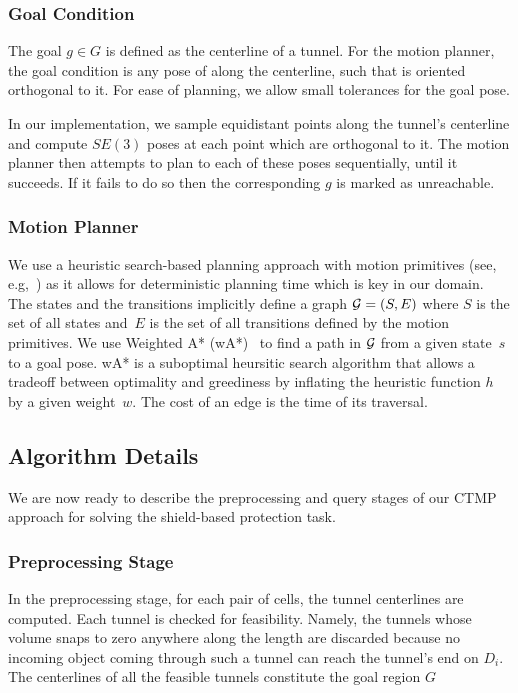 \documentclass[a4paper]{report}
\begin{document}
\subsubsection{Goal Condition}
The goal $g \in G$ is defined as the centerline of a tunnel. For the motion planner, the goal condition is any pose of \calS along the centerline, such that \calS is oriented orthogonal to it. For ease of planning, we allow small tolerances for the goal pose.

In our implementation, we sample equidistant points along the tunnel's centerline and compute $SE(3)$ poses at each point which are orthogonal to it. The motion planner then attempts to plan to each of these poses sequentially, until it succeeds. If it fails to do so then the corresponding $g$ is marked as unreachable.
 
\subsubsection{Motion Planner}
We use a heuristic search-based planning approach with motion primitives (see, e.g,~\cite{CCL10,CSCL11,LF09})
as it allows for deterministic planning time which is key in our domain.
The states and the transitions implicitly define a graph $\mathcal{G} = (S,E)$ where $S$ is the set of all states and~$E$ is the set of all transitions defined by the motion primitives. We use Weighted A* (wA*)~\cite{pohl1970heuristic} to find a path in $\mathcal{G}$ from a given state~$s$ to a goal pose. 
wA* is a suboptimal heursitic search algorithm that allows a tradeoff between optimality and greediness by inflating the heuristic function $h$ by a given weight~$w$. The cost of an edge is the time of its traversal.

\subsection{Algorithm Details}
We are now ready to describe the preprocessing and query stages of our CTMP approach for solving the shield-based protection task.

\subsubsection{Preprocessing Stage}
In the preprocessing stage, for each pair of cells, the tunnel centerlines are computed. Each tunnel is checked for feasibility. Namely, the tunnels whose volume snaps to zero anywhere along the length are discarded because no incoming object coming through such a tunnel can reach the tunnel's end on $D_i$. The centerlines of all the feasible tunnels constitute the goal region $G$
\end{document}
